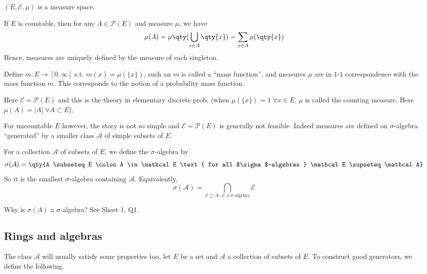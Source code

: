 \begin{remark}
	$(E, \mathcal{E}, \mu)$ is a measure space.
\end{remark}

\begin{remark}
	If $E$ is countable, then for any $A \in \mathcal P(E)$ and measure $\mu$, we have
	\[ \mu(A) = \mu\qty(\bigcup_{x\in A} \qty{x}) = \sum_{x \in A} \mu(\qty{x}) \]
	Hence, measures are uniquely defined by the measure of each singleton.

	Define $m : E \to [0, \infty]$ s.t. $m(x) = \mu(\{x\})$, such an $m$ is called a ``mass function'', and measures $\mu$ are in $1$-$1$ correspondence with the mass function $m$.
	This corresponds to the notion of a probability mass function.

	Here $\mathcal{E} = \mathcal{P}(E)$ and this is the theory in elementary discrete prob. (when $\mu(\{x\}) = 1 \; \forall x \in E$, $\mu$ is called the counting measure. Here $\mu(A) = |A| \; \forall A \subset E$).

	For uncountable $E$  however, the story is not so simple and $\mathcal{E} = \mathcal{P}(E)$ is generally not feasible. Indeed measures are defined on $\sigma$-algebra ``generated'' by a smaller class $\mathcal{A}$ of simple subsets of $E$.
\end{remark}

\begin{definition}
	For a collection $\mathcal A$ of subsets of $E$, we define the $\sigma$-algebra  by
	\[ \sigma(\mathcal A) = \qty{A \subseteq E \colon A \in \mathcal E \text{ for all $\sigma$-algebras } \mathcal E \supseteq \mathcal A} \]
	So it is the smallest $\sigma$-algebra containing $\mathcal A$.
	Equivalently,
	\[ \sigma(\mathcal A) = \bigcap_{\mathcal E \supseteq \mathcal A,\ \mathcal E \text{ a $\sigma$-algebra}} \mathcal E \]
\end{definition}

\begin{question}
	Why is $\sigma(A)$ a $\sigma$-algebra? See Sheet 1, Q1.
\end{question}

\subsection{Rings and algebras}
The class $\mathcal{A}$ will usually satisfy some properties too, let $E$ be a set and $\mathcal{A}$ a collection of subsets of $E$.
To construct good generators, we define the following.

